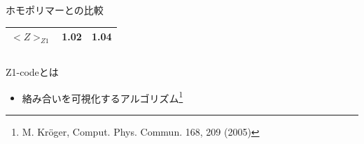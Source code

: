 \documentclass[12pt, dvipdfmx]{beamer}
\begin{document}
\begin{frame}
\begin{columns}[T, onlytextwidth]
\begin{block}{ホモポリマーとの比較}
\begin{center}
\begin{tabular}{c||c|c}
                        \alert{$<Z>_{Z1}$}&\alert{1.02}& \alert{1.04}\\ \hline
                    \end{tabular}
                \end{center}
            \end{block}
        \end{columns}
    \begin{alertblock}{Z1-codeとは}
        \begin{itemize}
            \item 絡み合いを可視化するアルゴリズム\footnote{
                M. Kröger, Comput. Phys. Commun. 168, 209 (2005)
            }
        \end{itemize}
    \end{alertblock}
\end{frame}
\end{document}
